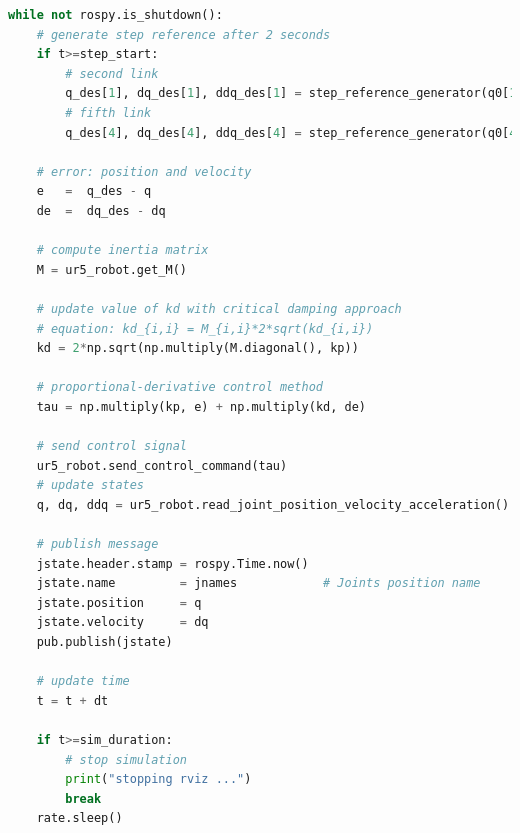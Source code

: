 \begin{lstlisting}[language=Python,caption={Rosnode to move the second and fifth joint of UR5 robot with the requirement motion of activity 1.5.}, label={lst:joint_PD_control_critical_damping}]
while not rospy.is_shutdown():
    # generate step reference after 2 seconds
    if t>=step_start:
        # second link
        q_des[1], dq_des[1], ddq_des[1] = step_reference_generator(q0[1], -0.4)
        # fifth link
        q_des[4], dq_des[4], ddq_des[4] = step_reference_generator(q0[4], 0.5)

    # error: position and velocity
    e 	=  q_des - q
    de 	=  dq_des - dq    

    # compute inertia matrix
    M = ur5_robot.get_M()

    # update value of kd with critical damping approach
    # equation: kd_{i,i} = M_{i,i}*2*sqrt(kd_{i,i})
    kd = 2*np.sqrt(np.multiply(M.diagonal(), kp))

    # proportional-derivative control method
    tau = np.multiply(kp, e) + np.multiply(kd, de)
    
    # send control signal
    ur5_robot.send_control_command(tau)
    # update states
    q, dq, ddq = ur5_robot.read_joint_position_velocity_acceleration()

    # publish message
    jstate.header.stamp = rospy.Time.now()
    jstate.name 		= jnames			# Joints position name
    jstate.position 	= q
    jstate.velocity 	= dq
    pub.publish(jstate)

    # update time
    t = t + dt

    if t>=sim_duration:
        # stop simulation
        print("stopping rviz ...")
        break
    rate.sleep()
\end{lstlisting}

